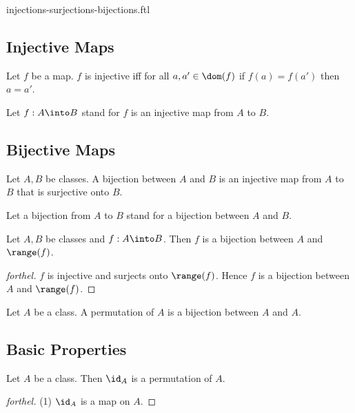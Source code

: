 \documentclass{naproche-library}
\begin{document}
\begin{smodule}{injections-surjections-bijections.ftl}
  \subsection*{Injective Maps}

  \begin{definition}[forthel,id=FOUNDATIONS_08_605931408719872]
    Let $f$ be a map.
    $f$ is injective iff for all $a, a' \in \dom(f)$ if $f(a) = f(a')$ then $a = a'$.

    Let $f: A \into B$ stand for $f$ is an injective map from $A$ to $B$.
  \end{definition}


  \subsection*{Bijective Maps}

  \begin{definition}[forthel,id=FOUNDATIONS_08_3356670992318464]
    Let $A, B$ be classes.
    A bijection between $A$ and $B$ is an injective map from $A$ to $B$ that is surjective onto $B$.

    Let a bijection from $A$ to $B$ stand for a bijection between $A$ and $B$.
  \end{definition}

  \begin{proposition}[forthel,id=FOUNDATIONS_08_60881194975232]
    Let $A, B$ be classes and $f : A \into B$.
    Then $f$ is a bijection between $A$ and $\range(f)$.
  \end{proposition}
  \begin{proof}[forthel]
    $f$ is injective and surjects onto $\range(f)$.
    Hence $f$ is a bijection between $A$ and $\range(f)$.
  \end{proof}

  \begin{definition}[forthel,id=FOUNDATIONS_08_8188451318923264]
    Let $A$ be a class.
    A permutation of $A$ is a bijection between $A$ and $A$.
  \end{definition}


  \subsection*{Basic Properties}

  \begin{proposition}[forthel,id=FOUNDATIONS_08_7883784041005056]
    Let $A$ be a class.
    Then $\id_{A}$ is a permutation of $A$.
  \end{proposition}
  \begin{proof}[forthel]
    (1) $\id_{A}$ is a map on $A$.


\end{proof}
\end{smodule}
\end{document}
